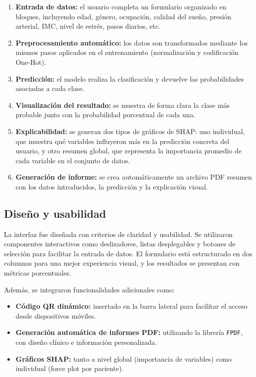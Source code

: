 \begin{enumerate}
    \item \textbf{Entrada de datos:} el usuario completa un formulario organizado en bloques, incluyendo edad, género, ocupación, calidad del sueño, presión arterial, IMC, nivel de estrés, pasos diarios, etc.
    \item \textbf{Preprocesamiento automático:} los datos son transformados mediante los mismos pasos aplicados en el entrenamiento (normalización y codificación One-Hot).
    \item \textbf{Predicción:} el modelo realiza la clasificación y devuelve las probabilidades asociadas a cada clase.
    \item \textbf{Visualización del resultado:} se muestra de forma clara la clase más probable junto con la probabilidad porcentual de cada una.
    \item \textbf{Explicabilidad:} se generan dos tipos de gráficos de SHAP: uno individual, que muestra qué variables influyeron más en la predicción concreta del usuario, y otro resumen global, que representa la importancia promedio de cada variable en el conjunto de datos.
    \item \textbf{Generación de informe:} se crea automáticamente un archivo PDF resumen con los datos introducidos, la predicción y la explicación visual.
\end{enumerate}

\subsection{Diseño y usabilidad}

La interfaz fue diseñada con criterios de claridad y usabilidad. Se utilizaron componentes interactivos como deslizadores, listas desplegables y botones de selección para facilitar la entrada de datos. El formulario está estructurado en dos columnas para una mejor experiencia visual, y los resultados se presentan con métricas porcentuales.

Además, se integraron funcionalidades adicionales como:

\begin{itemize}
    \item \textbf{Código QR dinámico:} insertado en la barra lateral para facilitar el acceso desde dispositivos móviles.
    \item \textbf{Generación automática de informes PDF:} utilizando la librería \texttt{FPDF}, con diseño clínico e información personalizada.
    \item \textbf{Gráficos SHAP:} tanto a nivel global (importancia de variables) como individual (force plot por paciente).
\end{itemize}

